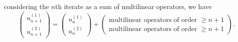 \documentclass[a4paper, 12pt]{article}
\begin{document}
\begin{lem}\label{lemma1}
	considering the $n$th iterate as a sum of multilinear operators, we have
	\begin{equation}\label{lem1:1}
		\begin{pmatrix} u_{n + 1}^{(1)}\\u_{n + 1}^{(2)} \end{pmatrix} = \begin{pmatrix} u_n^{(1)}\\u_n^{(2)} \end{pmatrix} + \begin{pmatrix} \text{multilinear operators of order $\ge n + 1$}\\\text{multilinear operators of order $\ge n + 1$} \end{pmatrix}
	.\end{equation}
\end{lem}
\end{document}
